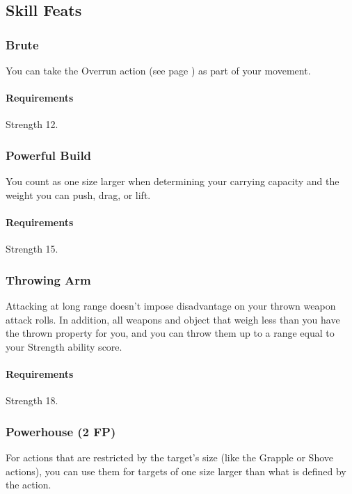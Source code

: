 \subsection*{Skill Feats}
\subsubsection{Brute} \label{feat::brute}
    You can take the Overrun action (see page \pageref{act::overrun}) as part of your movement.
    \paragraph{Requirements} Strength 12.
\subsubsection{Powerful Build} \label{feat::powerfulbuild_skill}
    You count as one size larger when determining your carrying capacity and the weight you can push, drag, or lift.
    \paragraph{Requirements} Strength 15.
\subsubsection{Throwing Arm} \label{feat::throwingarm}
    Attacking at long range doesn't impose disadvantage on your thrown weapon attack rolls.
    In addition, all weapons and object that weigh less than you have the thrown property for you, and you can throw them up to a range equal to your Strength ability score.
    \paragraph{Requirements} Strength 18.
\subsubsection{Powerhouse (2 FP)} \label{feat::powerhouse}
    For actions that are restricted by the target's size (like the Grapple or Shove actions), you can use them for targets of one size larger than what is defined by the action.
